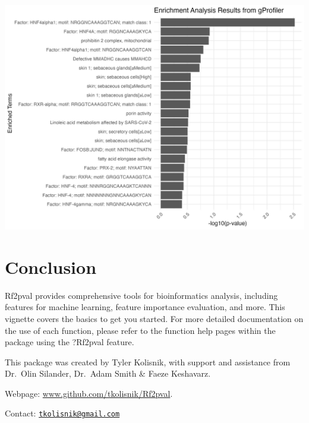 \documentclass[
]{article}
\begin{document}
\begin{center}\includegraphics[width=1\linewidth]{images/demo_signif_gprofiler_resplot} \end{center}

\hypertarget{conclusion}{%
\section{Conclusion}\label{conclusion}}

Rf2pval provides comprehensive tools for bioinformatics analysis,
including features for machine learning, feature importance evaluation,
and more. This vignette covers the basics to get you started. For more
detailed documentation on the use of each function, please refer to the
function help pages within the package using the ?Rf2pval feature.

This package was created by Tyler Kolisnik, with support and assistance
from Dr.~Olin Silander, Dr.~Adam Smith \& Faeze Keshavarz.

Webpage: \url{www.github.com/tkolisnik/Rf2pval}.

Contact:
\href{mailto:tkolisnik@gmail.com}{\nolinkurl{tkolisnik@gmail.com}}
\end{document}
